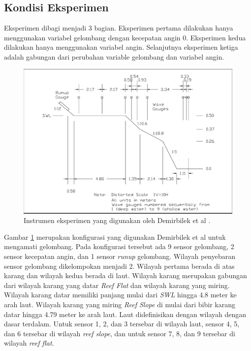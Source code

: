 \subsection{Kondisi Eksperimen}

\label{kondisiEksperimen}

Eksperimen dibagi menjadi 3 bagian. Eksperimen pertama dilakukan hanya menggunakan variabel gelombang dengan kecepatan angin 0. Eksperimen kedua dilakukan hanya menggunakan variabel angin. Selanjutnya eksperimen ketiga adalah gabungan dari perubahan variable gelombang dan variabel angin.

\begin{figure}[htbp!]
  \begin{center}
    \includegraphics[scale=0.15]{./images/instrumen_eksperimen.png}
  \end{center}
  \caption{Instrumen eksperimen yang digunakan oleh Demirbilek et al \cite{DemirbilekReport}.}
  \label{fig:intrumen_demirbilek}
\end{figure}

Gambar \ref{fig:intrumen_demirbilek} merupakan konfigurasi yang digunakan Demirbilek et al \cite{DemirbilekReport} untuk mengamati gelombang. Pada konfigurasi tersebut ada 9 sensor gelombang, 2 sensor kecepatan angin, dan 1 sensor \emph{runup} gelombang. Wilayah penyebaran sensor gelombang dikelompokan menjadi 2. Wilayah pertama berada di atas karang dan wilayah kedua berada di laut. Wilayah karang merupakan gabungan dari wilayah karang yang datar \emph{Reef Flat} dan wilayah karang yang miring. Wilayah karang datar memiliki panjang mulai dari \emph{SWL} hingga 4.8 meter ke arah laut. Wilayah karang yang miring \emph{Reef Slope} di mulai dari bibir karang datar hingga 4.79 meter ke arah laut. Laut didefinisikan dengan wilayah dengan dasar terdalam. Untuk sensor 1, 2, dan 3 tersebar di wilayah laut, sensor 4, 5, dan 6 tersebar di wilayah \emph{reef slope}, dan untuk sensor 7, 8, dan 9 tersebar di wilayah \emph{reef flat}.


